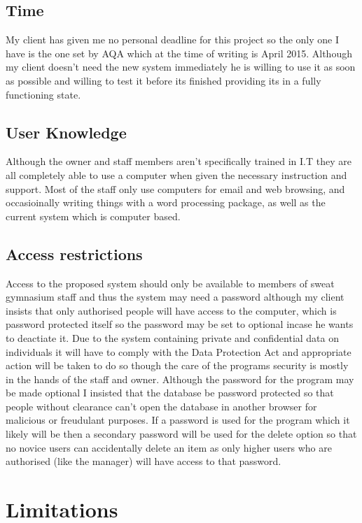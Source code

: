 \subsection{Time}

My client has given me no personal deadline for this project so the only one I have is the one set by AQA which at the time of writing is April 2015. Although my client doesn't need the new system immediately he is willing to use it as soon as possible and willing to test it before its finished providing its in a fully functioning state.

\subsection{User Knowledge}

Although the owner and staff members aren't specifically trained in I.T they are all completely able to use a computer when given the necessary instruction and support. Most of the staff only use computers for email and web browsing, and occasioinally writing things with a word processing package, as well as the current system which is computer based.

\subsection{Access restrictions}

Access to the proposed system should only be available to members of sweat gymnasium staff and thus the system may need a password although my client insists that only authorised people will have access to the computer, which is password protected itself so the password may be set to optional incase he wants to deactiate it. Due to the system containing private and confidential data on individuals it will have to comply with the Data Protection Act and appropriate action will be taken to do so though the care of the programs security is mostly in the hands of the staff and owner. Although the password for the program may be made optional I insisted that the database be password protected so that people without clearance can't open the database in another browser for malicious or freudulant purposes. If a password is used for the program which it likely will be then a secondary password will be used for the delete option so that no novice users can accidentally delete an item as only higher users who are authorised (like the manager) will have access to that password.

\section{Limitations}

